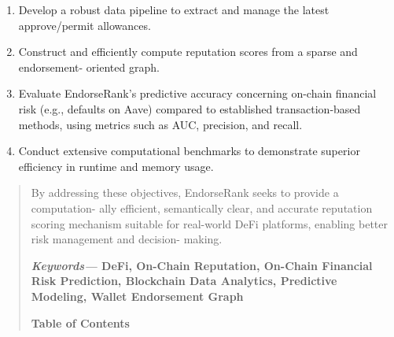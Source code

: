 \documentclass[
]{article}
\begin{document}
\begin{enumerate}
\def\labelenumi{\arabic{enumi}.}
\item
  Develop a robust data pipeline to extract and manage the latest approve/permit allowances.
\item
  Construct and efficiently compute reputation scores from a sparse and endorsement- oriented graph.
\item
  Evaluate EndorseRank's predictive accuracy concerning on-chain financial risk (e.g., defaults on Aave) compared to established transaction-based methods, using metrics such as AUC, precision, and recall.
\item
  Conduct extensive computational benchmarks to demonstrate superior efficiency in runtime and memory usage.
\end{enumerate}

\begin{quote}
By addressing these objectives, EndorseRank seeks to provide a computation- ally efficient, semantically clear, and accurate reputation scoring mechanism suitable for real-world DeFi platforms, enabling better risk management and decision- making.

\textbf{\emph{Keywords---} DeFi, On-Chain Reputation, On-Chain Financial Risk Prediction, Blockchain Data Analytics, Predictive Modeling, Wallet Endorsement Graph}

\textbf{Table of Contents}
\end{quote}
\end{document}
